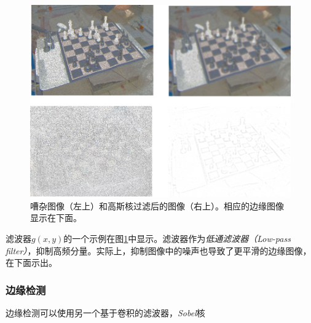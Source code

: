 \begin{figure}
	\centering
		\includegraphics[width=\textwidth]{figs/filters}
	\caption{嘈杂图像（左上）和高斯核过滤后的图像（右上）。相应的边缘图像显示在下面。
	\label{fig:filters}}
\end{figure}


滤波器$g(x,y)$的一个示例在图\ref{fig:filters}中显示。滤波器作为\emph{低通滤波器（Low-pass filter）}，抑制高频分量。实际上，抑制图像中的噪声也导致了更平滑的边缘图像，在下面示出。



\subsubsection{边缘检测}
\label{sec:sobel}
边缘检测可以使用另一个基于卷积的滤波器，\emph{Sobel}核

